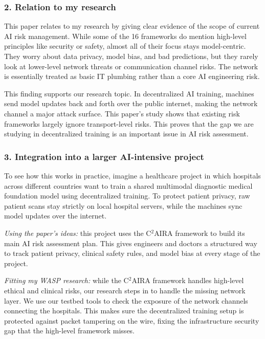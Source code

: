\documentclass[11pt,a4paper]{article}
\begin{document}
\subsubsection*{2. Relation to my research}

This paper relates to my research by giving clear evidence of the scope of current AI risk management. While some of the 16 frameworks do mention high-level principles like security or safety, almost all of their focus stays model-centric. They worry about data privacy, model bias, and bad predictions, but they rarely look at lower-level network threats or communication channel risks. The network is essentially treated as basic IT plumbing rather than a core AI engineering risk.

This finding supports our research topic. In decentralized AI training, machines send model updates back and forth over the public internet, making the network channel a major attack surface. This paper's study shows that existing risk frameworks largely ignore transport-level risks. This proves that the gap we are studying in decentralized training is an important issue in AI risk assessment.

\subsubsection*{3. Integration into a larger AI-intensive project}

To see how this works in practice, imagine a healthcare project in which hospitals across different countries want to train a shared multimodal diagnostic medical foundation model using decentralized training. To protect patient privacy, raw patient scans stay strictly on local hospital servers, while the machines sync model updates over the internet.

\emph{Using the paper's ideas:} this project uses the C$^2$AIRA framework to build its main AI risk assessment plan. This gives engineers and doctors a structured way to track patient privacy, clinical safety rules, and model bias at every stage of the project.

\emph{Fitting my WASP research:} while the C$^2$AIRA framework handles high-level ethical and clinical risks, our research steps in to handle the missing network layer. We use our testbed tools to check the exposure of the network channels connecting the hospitals. This makes sure the decentralized training setup is protected against packet tampering on the wire, fixing the infrastructure security gap that the high-level framework misses.
\end{document}
